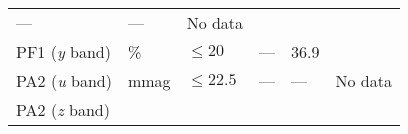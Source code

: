 \documentclass[DM,toc]{lsstdoc}
\begin{document}
\begin{longtable}[]{@{}llllll@{}}
\begin{minipage}[t]{0.17\columnwidth}
---\strut
\end{minipage} & \begin{minipage}[t]{0.12\columnwidth}\raggedright\strut
---\strut
\end{minipage} & \begin{minipage}[t]{0.17\columnwidth}\raggedright\strut
No data\strut
\end{minipage}\tabularnewline
\begin{minipage}[t]{0.14\columnwidth}\raggedright\strut
PF1 (\emph{y} band)\strut
\end{minipage} & \begin{minipage}[t]{0.06\columnwidth}\raggedright\strut
\%\strut
\end{minipage} & \begin{minipage}[t]{0.17\columnwidth}\raggedright\strut
\(\leq 20\)\strut
\end{minipage} & \begin{minipage}[t]{0.17\columnwidth}\raggedright\strut
---\strut
\end{minipage} & \begin{minipage}[t]{0.12\columnwidth}\raggedright\strut
36.9\strut
\end{minipage} & \begin{minipage}[t]{0.17\columnwidth}\raggedright\strut
\strut
\end{minipage}\tabularnewline
\begin{minipage}[t]{0.14\columnwidth}\raggedright\strut
PA2 (\emph{u} band)\strut
\end{minipage} & \begin{minipage}[t]{0.06\columnwidth}\raggedright\strut
mmag\strut
\end{minipage} & \begin{minipage}[t]{0.17\columnwidth}\raggedright\strut
\(\leq 22.5\)\strut
\end{minipage} & \begin{minipage}[t]{0.17\columnwidth}\raggedright\strut
---\strut
\end{minipage} & \begin{minipage}[t]{0.12\columnwidth}\raggedright\strut
---\strut
\end{minipage} & \begin{minipage}[t]{0.17\columnwidth}\raggedright\strut
No data\strut
\end{minipage}\tabularnewline
\begin{minipage}[t]{0.14\columnwidth}\raggedright\strut
PA2 (\emph{z} band)\strut
\end{minipage} & \begin{minipage}[t]{0.06\columnwidth}\raggedright\strut

\end{minipage}
\end{longtable}
\end{document}
